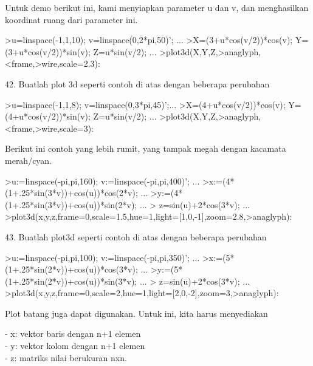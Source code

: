\documentclass[a4paper,10pt]{article}
\begin{document}
\begin{eulernotebook}
\begin{eulercomment}
Untuk demo berikut ini, kami menyiapkan parameter u dan v, dan
menghasilkan koordinat ruang dari parameter ini.
\end{eulercomment}
\begin{eulerprompt}
>u=linspace(-1,1,10); v=linspace(0,2*pi,50)'; ...
>X=(3+u*cos(v/2))*cos(v); Y=(3+u*cos(v/2))*sin(v); Z=u*sin(v/2); ...
>plot3d(X,Y,Z,>anaglyph,<frame,>wire,scale=2.3):
\end{eulerprompt}
\begin{eulercomment}
42. Buatlah plot 3d seperti contoh di atas dengan beberapa perubahan
\end{eulercomment}
\begin{eulerprompt}
>u=linspace(-1,1,8); v=linspace(0,3*pi,45)';...
>X=(4+u*cos(v/2))*cos(v); Y=(4+u*cos(v/2))*sin(v); Z=u*sin(v/2); ...
>plot3d(X,Y,Z,>anaglyph,<frame,>wire,scale=3):
\end{eulerprompt}
\begin{eulercomment}
Berikut ini contoh yang lebih rumit, yang tampak megah dengan kacamata
merah/cyan.
\end{eulercomment}
\begin{eulerprompt}
>u:=linspace(-pi,pi,160); v:=linspace(-pi,pi,400)';  ...
>x:=(4*(1+.25*sin(3*v))+cos(u))*cos(2*v); ...
>y:=(4*(1+.25*sin(3*v))+cos(u))*sin(2*v); ...
> z=sin(u)+2*cos(3*v); ...
>plot3d(x,y,z,frame=0,scale=1.5,hue=1,light=[1,0,-1],zoom=2.8,>anaglyph):
\end{eulerprompt}
\begin{eulercomment}
43. Buatlah plot3d seperti contoh di atas dengan beberapa perubahan
\end{eulercomment}
\begin{eulerprompt}
>u:=linspace(-pi,pi,100); v:=linspace(-pi,pi,350)';  ...
>x:=(5*(1+.25*sin(2*v))+cos(u))*cos(3*v); ...
>y:=(5*(1+.25*sin(2*v))+cos(u))*sin(3*v); ...
> z=sin(u)+2*cos(3*v); ...
>plot3d(x,y,z,frame=0,scale=2,hue=1,light=[2,0,-2],zoom=3,>anaglyph): 
\end{eulerprompt}
\begin{eulercomment}
Plot batang juga dapat digunakan. Untuk ini, kita harus menyediakan

- x: vektor baris dengan n+1 elemen\\
- y: vektor kolom dengan n+1 elemen\\
- z: matriks nilai berukuran nxn.


\end{eulercomment}
\end{eulernotebook}
\end{document}
